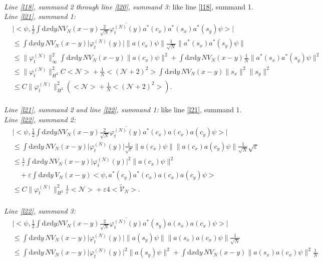 \documentclass[11pt,a4paper,draft,DIV11]{scrartcl}	%
\newcommand{\di}{\textrm{d}}		%
\newcommand{\Ncal}{\mathcal{N}}		%
\newcommand{\tilV}{\tilde{\mathcal{V}}_N}		%
\newcommand{\estlist}[2]{\emph{\vspace{.3em}\\Line \ref{l#1}, summand #2:}}
\newcommand{\nestlist}[2]{line \ref{l#1}, summand #2}
\newcommand{\Nestlist}[2]{Line \ref{l#1}, summand #2}
\newcommand{\scal}[2]{\big<#1,#2\big>} %
\newcommand{\cc}[1]{\overline{#1}}	%
\newcommand{\norm}[1]{\lVert#1\rVert}	%
\newcommand{\ev}[1]{\big<#1\big>}	%
\newcommand{\ph}{\varphi_t^{(N)}}	%
\newcommand{\dxyNV}{\frac{1}{2}\int \di x\di y N V_N(x-y)} %
\begin{document}
\begin{fleqn}[0.5em]
\emph{\vspace{.3em}\\\Nestlist{18}{2} through \nestlist{20}{3}:} like \nestlist{18}{1}.\newline
\estlist{21}{1}
\begin{align*}
 & \lvert \scal{\psi}{\dxyNV \frac{2}{\sqrt{N}}\cc{\ph(y)}a^\ast(c_x)a^\ast(s_x)a^\ast(s_y)\psi} \rvert \\
& \leq \int \di x\di y\, NV_N(x-y) \lvert\ph(y)\rvert \norm{a(c_x)\psi}\frac{1}{\sqrt{N}}\norm{a^\ast(s_x)a^\ast(s_y)\psi} \\
& \leq \norm{\ph}_\infty^2 \int \di x\di y\, NV_N(x-y) \norm{a(c_x)\psi}^2 + \int \di x\di y\, NV_N(x-y) \frac{1}{N} \norm{a^\ast(s_x)a^\ast(s_y)\psi}^2 \\
& \leq \norm{\ph}_{H^2}^2 C \ev{\Ncal} + \frac{1}{N}\ev{(\Ncal+2)^2} \int \di x\di y\, NV_N(x-y) \norm{s_x}^2 \norm{s_y}^2 \\
& \leq C\norm{\ph}_{H^2}^2 \left( \ev{\Ncal} + \frac{1}{N}\ev{(\Ncal+2)^2} \right).
\end{align*}
\emph{\vspace{.3em}\\\Nestlist{21}{2} and \nestlist{22}{1}:} like \nestlist{21}{1}.\newline
\estlist{22}{2}
\begin{align*}
 & \lvert \scal{\psi}{\dxyNV \frac{2}{\sqrt{N}}\cc{\ph(y)} a^\ast(c_x)a(c_x)a(c_y)\psi} \rvert \\
& \leq \int \di x\di y\, NV_N(x-y) \lvert \ph(y)\rvert \frac{1}{\sqrt{\varepsilon}} \norm{a(c_x)\psi} \norm{a(c_x)a(c_y)\psi} \frac{1}{\sqrt{N}}\sqrt{\varepsilon} \\
& \leq \frac{1}{\varepsilon}\int \di x\di y\, NV_N(x-y) \lvert \ph(y)\rvert^2
  \norm{a(c_x)\psi}^2 \\
& \quad  + \varepsilon \int \di x\di y\, V_N(x-y) \scal{\psi}{a^\ast(c_y)a^\ast(c_x)a(c_x)a(c_y) \psi} \\
& \leq C\norm{\ph}_{H^2}^2 \frac{1}{\varepsilon}\ev{\Ncal} + \varepsilon 4\ev{\tilV}.
\end{align*}
\estlist{22}{3}
\begin{align*}
& \lvert \scal{\psi}{\dxyNV \frac{2}{\sqrt{N}} \cc{\ph(y)}a^\ast(s_y)a(s_x)a(c_x)\psi} \rvert \\
& \leq \int \di x\di y\, NV_N(x-y) \lvert \ph(y)\rvert \norm{a(s_y)\psi} \norm{a(s_x)a(c_x)\psi}\frac{1}{\sqrt{N}} \\
& \leq \int \di x \di y\, NV_N(x-y) \lvert\ph(y)\rvert^2 \norm{a(s_y)\psi}^2 + \int \di x\di y\, NV_N(x-y) \norm{a(s_x)a(c_x)\psi}^2 \frac{1}{N} \\

\end{align*}
\end{fleqn}
\end{document}
